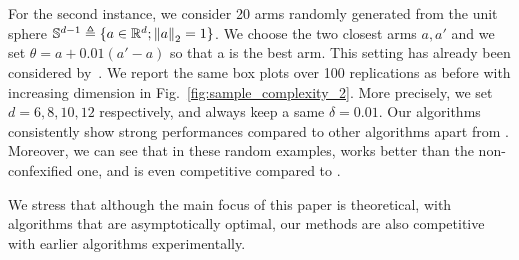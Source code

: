 For the second instance, we consider 20 arms randomly generated from the unit sphere $\mathbb{S}^{d-1}\triangleq\{a\in\mathbb{R}^d; \left\lVert a\right\rVert_2=1\}$. We choose the two closest arms $a, a'$ and we set $\theta = a + 0.01(a'-a)$ so that a is the best arm. This setting has already been considered by~\citet{tao2018alba}. We report the same box plots over 100 replications as before with increasing dimension in Fig.~\ref{fig:sample_complexity_2}. More precisely, we set $d=6, 8, 10, 12$ respectively, and always keep a same $\delta = 0.01$. Our algorithms consistently show strong performances compared to other algorithms apart from \LGapE. Moreover, we can see that in these random examples, \LGC works better than the non-confexified one, and is even competitive compared to \LGapE.

We stress that although the main focus of this paper is theoretical, with algorithms that are asymptotically optimal, our methods are also competitive with earlier algorithms experimentally.
